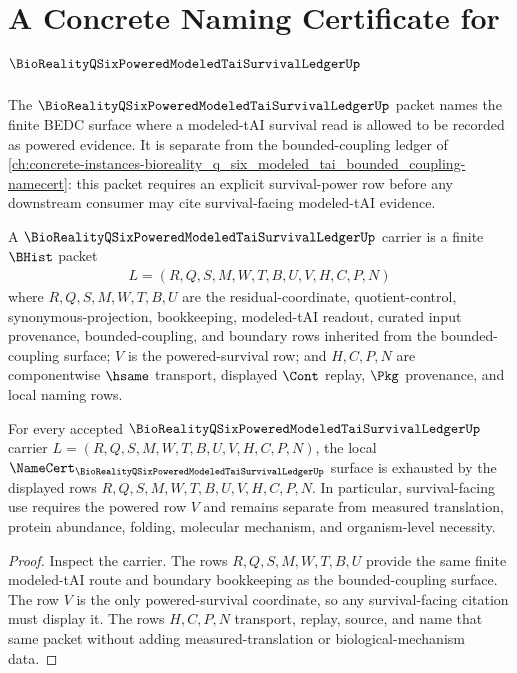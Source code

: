 \chapter{A Concrete Naming Certificate for $\BioRealityQSixPoweredModeledTaiSurvivalLedgerUp$}
\label{ch:concrete-instances-bioreality_q_six_powered_modeled_tai_survival-namecert}

The $\BioRealityQSixPoweredModeledTaiSurvivalLedgerUp$ packet names the finite BEDC surface where a modeled-tAI survival read is allowed to be recorded as powered evidence. It is separate from the bounded-coupling ledger of \autoref{ch:concrete-instances-bioreality_q_six_modeled_tai_bounded_coupling-namecert}: this packet requires an explicit survival-power row before any downstream consumer may cite survival-facing modeled-tAI evidence.

\begin{definition}
\label{def:bioreality-q-six-powered-modeled-tai-survival-ledger-carrier}
A $\BioRealityQSixPoweredModeledTaiSurvivalLedgerUp$ carrier is a finite $\BHist$ packet
$$
\begin{gathered}
L=(R,Q,S,M,W,T,B,U,V,H,C,P,N)
\end{gathered}
$$
where $R,Q,S,M,W,T,B,U$ are the residual-coordinate, quotient-control, synonymous-projection, bookkeeping, modeled-tAI readout, curated input provenance, bounded-coupling, and boundary rows inherited from the bounded-coupling surface; $V$ is the powered-survival row; and $H,C,P,N$ are componentwise $\hsame$ transport, displayed $\Cont$ replay, $\Pkg$ provenance, and local naming rows.
\end{definition}

\begin{theorem}
\label{thm:bioreality-q-six-powered-modeled-tai-survival-ledger-namecert-obligations}
For every accepted $\BioRealityQSixPoweredModeledTaiSurvivalLedgerUp$ carrier $L=(R,Q,S,M,W,T,B,U,V,H,C,P,N)$, the local $\NameCert_{\BioRealityQSixPoweredModeledTaiSurvivalLedgerUp}$ surface is exhausted by the displayed rows $R,Q,S,M,W,T,B,U,V,H,C,P,N$. In particular, survival-facing use requires the powered row $V$ and remains separate from measured translation, protein abundance, folding, molecular mechanism, and organism-level necessity.
\end{theorem}

\begin{proof}
Inspect the carrier. The rows $R,Q,S,M,W,T,B,U$ provide the same finite modeled-tAI route and boundary bookkeeping as the bounded-coupling surface. The row $V$ is the only powered-survival coordinate, so any survival-facing citation must display it. The rows $H,C,P,N$ transport, replay, source, and name that same packet without adding measured-translation or biological-mechanism data.
\end{proof}

